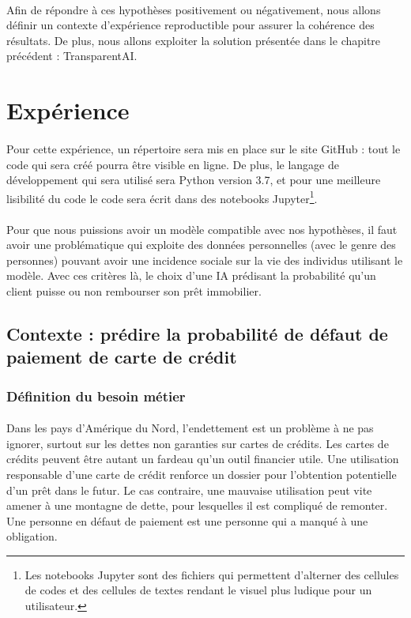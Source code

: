 \documentclass[10pt, french, a4paper]{report}
\begin{document}
\paragraph{}
Afin de répondre à ces hypothèses positivement ou négativement, nous allons définir un contexte d'expérience reproductible pour assurer la cohérence des résultats. De plus, nous allons exploiter la solution présentée dans le chapitre précédent : TransparentAI.

\section{Expérience}

\paragraph{}
Pour cette expérience, un répertoire sera mis en place sur le site GitHub : tout le code qui sera créé pourra être visible en ligne. De plus, le langage de développement qui sera utilisé sera Python version 3.7, et pour une meilleure lisibilité du code le code sera écrit dans des notebooks Jupyter\footnote{Les notebooks Jupyter sont des fichiers qui permettent d'alterner des cellules de codes et des cellules de textes rendant le visuel plus ludique pour un utilisateur.}.

\paragraph{}
Pour que nous puissions avoir un modèle compatible avec nos hypothèses, il faut avoir une problématique qui exploite des données personnelles (avec le genre des personnes) pouvant avoir une incidence sociale sur la vie des individus utilisant le modèle. Avec ces critères là, le choix d'une IA prédisant la probabilité qu'un client puisse ou non rembourser son prêt immobilier.

\subsection{Contexte : prédire la probabilité de défaut de paiement de carte de crédit}

\subsubsection{Définition du besoin métier}

\paragraph{}
Dans les pays d'Amérique du Nord, l'endettement est un problème à ne pas ignorer, surtout sur les dettes non garanties sur cartes de crédits. Les cartes de crédits peuvent être autant un fardeau qu'un outil financier utile. Une utilisation responsable d'une carte de crédit renforce un dossier pour l'obtention potentielle d'un prêt dans le futur. Le cas contraire, une mauvaise utilisation peut vite amener à une montagne de dette, pour lesquelles il est compliqué de remonter. Une personne en défaut de paiement est une personne qui a manqué à une obligation. 
\end{document}
